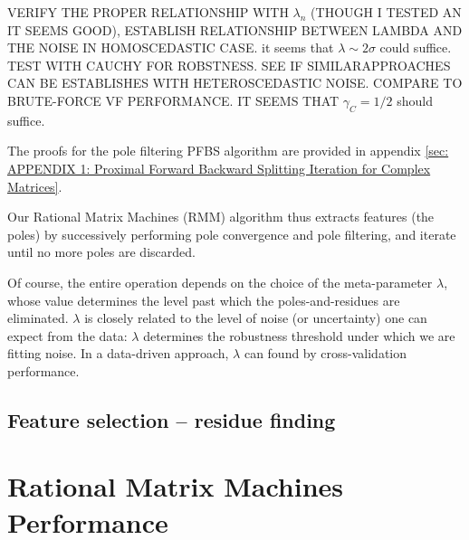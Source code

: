 \documentclass{article}
\begin{document}
VERIFY THE PROPER RELATIONSHIP WITH $\lambda_n$ (THOUGH I TESTED AN IT SEEMS GOOD), 
ESTABLISH RELATIONSHIP  BETWEEN LAMBDA AND THE NOISE IN HOMOSCEDASTIC CASE. it seems that $\lambda \sim 2 \sigma $ could suffice. TEST WITH CAUCHY FOR ROBSTNESS. 
SEE IF SIMILARAPPROACHES CAN BE ESTABLISHES WITH HETEROSCEDASTIC NOISE. COMPARE TO BRUTE-FORCE VF PERFORMANCE. IT SEEMS THAT $\gamma_C = 1/2$ should suffice.


The proofs for the pole filtering PFBS algorithm are provided in appendix \ref{sec: APPENDIX 1: Proximal Forward Backward Splitting Iteration for Complex Matrices}.

Our Rational Matrix Machines (RMM) algorithm thus extracts features (the poles) by successively performing pole convergence and pole filtering, and iterate until no more poles are discarded. 

Of course, the entire operation depends on the choice of the meta-parameter $\lambda$, whose value determines the level past which the poles-and-residues are eliminated. 
$\lambda$ is closely related to the level of noise (or uncertainty) one can expect from the data: $\lambda$ determines the robustness threshold under which we are fitting noise.
In a data-driven approach, $\lambda$ can found by cross-validation performance. 


\subsection{\label{sec: Feature selection}Feature selection -- residue finding}










\section{\label{sec: Rational Matrix Machines Performance}Rational Matrix Machines Performance}
\end{document}
